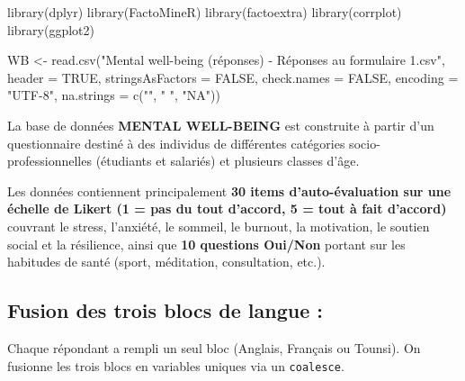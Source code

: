 \documentclass[
]{article}
\newenvironment{Shaded}{\begin{snugshade}}{\end{snugshade}}
\newcommand{\AttributeTok}[1]{\textcolor[rgb]{0.77,0.63,0.00}{#1}}
\newcommand{\ConstantTok}[1]{\textcolor[rgb]{0.00,0.00,0.00}{#1}}
\newcommand{\FunctionTok}[1]{\textcolor[rgb]{0.00,0.00,0.00}{#1}}
\newcommand{\NormalTok}[1]{#1}
\newcommand{\OtherTok}[1]{\textcolor[rgb]{0.56,0.35,0.01}{#1}}
\newcommand{\StringTok}[1]{\textcolor[rgb]{0.31,0.60,0.02}{#1}}
\begin{document}
\begin{Shaded}
\begin{Highlighting}[]
\FunctionTok{library}\NormalTok{(dplyr)}
\FunctionTok{library}\NormalTok{(FactoMineR)}
\FunctionTok{library}\NormalTok{(factoextra)}
\FunctionTok{library}\NormalTok{(corrplot)}
\FunctionTok{library}\NormalTok{(ggplot2)}

\NormalTok{WB }\OtherTok{\textless{}{-}} \FunctionTok{read.csv}\NormalTok{(}\StringTok{"Mental well{-}being (réponses) {-} Réponses au formulaire 1.csv"}\NormalTok{,}
               \AttributeTok{header =} \ConstantTok{TRUE}\NormalTok{, }\AttributeTok{stringsAsFactors =} \ConstantTok{FALSE}\NormalTok{,}
               \AttributeTok{check.names =} \ConstantTok{FALSE}\NormalTok{, }\AttributeTok{encoding =} \StringTok{"UTF{-}8"}\NormalTok{,}
               \AttributeTok{na.strings =} \FunctionTok{c}\NormalTok{(}\StringTok{""}\NormalTok{, }\StringTok{" "}\NormalTok{, }\StringTok{"NA"}\NormalTok{))}
\end{Highlighting}
\end{Shaded}

La base de données \textbf{MENTAL WELL-BEING} est construite à partir
d'un questionnaire destiné à des individus de différentes catégories
socio-professionnelles (étudiants et salariés) et plusieurs classes
d'âge.

Les données contiennent principalement \textbf{30 items
d'auto-évaluation sur une échelle de Likert (1 = pas du tout d'accord, 5
= tout à fait d'accord)} couvrant le stress, l'anxiété, le sommeil, le
burnout, la motivation, le soutien social et la résilience, ainsi que
\textbf{10 questions Oui/Non} portant sur les habitudes de santé (sport,
méditation, consultation, etc.).

\hypertarget{fusion-des-trois-blocs-de-langue}{%
\subsection{Fusion des trois blocs de langue
:}\label{fusion-des-trois-blocs-de-langue}}

Chaque répondant a rempli un seul bloc (Anglais, Français ou Tounsi). On
fusionne les trois blocs en variables uniques via un \texttt{coalesce}.
\end{document}
